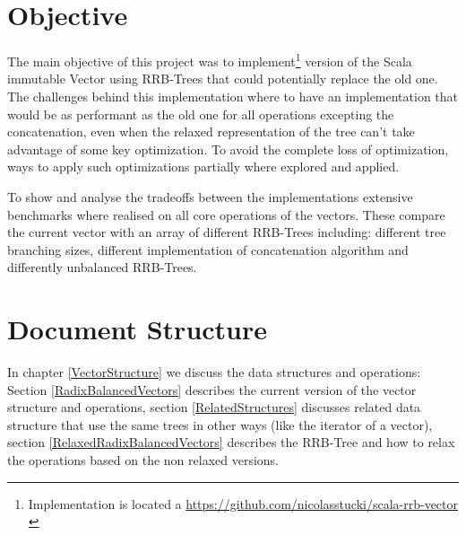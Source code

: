\section{Objective}
The main objective of this project was to implement\footnote{Implementation is located a \url{https://github.com/nicolasstucki/scala-rrb-vector} \cite{projecRepo}} version of the Scala immutable Vector using RRB-Trees that could potentially replace the old one. The challenges behind this implementation where to have an implementation that would be as performant as the old one for all operations excepting the concatenation, even when the relaxed representation of the tree can't take advantage of some key optimization. To avoid the complete loss of optimization, ways to apply such optimizations partially where explored and applied.

To show and analyse the tradeoffs between the implementations extensive benchmarks where realised on all core operations of the vectors. These compare the current vector with an array of different RRB-Trees including: different tree branching sizes, different implementation of concatenation algorithm and differently unbalanced RRB-Trees. 

\section{Document Structure}
In chapter \ref{VectorStructure} we discuss the data structures and operations: Section \ref{RadixBalancedVectors} describes the current version of the vector structure and operations, section \ref{RelatedStructures} discusses related data structure that use the same trees in other ways (like the iterator of a vector), section \ref{RelaxedRadixBalancedVectors} describes the RRB-Tree and how to relax the operations based on the non relaxed versions.

